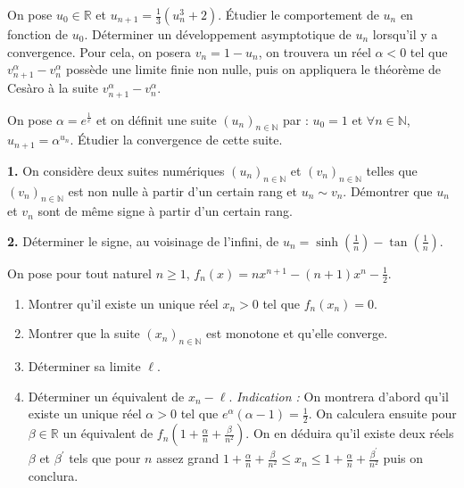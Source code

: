 \begin{exercice}
On pose $u_{0}\in\mathbb{R}$ et $u_{n+1}=\frac{1}{3}(u_{n}^{3}+2)$.
Étudier le comportement de $u_{n}$ en fonction de $u_{0}$.
Déterminer un développement asymptotique de $u_{n}$ lorsqu'il y a convergence.
Pour cela, on posera $v_{n}=1-u_{n}$, on trouvera un réel $\alpha<0$ tel que $v_{n+1}^{\alpha}-v_{n}^{\alpha}$ possède une limite finie non nulle, puis on appliquera le théorème de Cesàro à la suite $v_{n+1}^{\alpha}-v_{n}^{\alpha}$.
\end{exercice}

\begin{exercice}
On pose $\alpha=e^{\frac{1}{e}}$ et on définit une suite $(u_{n})_{n\in\mathbb{N}}$ par :
$u_{0}=1$ et $\forall n\in\mathbb{N}$, $u_{n+1}=\alpha^{u_{n}}$.
Étudier la convergence de cette suite.
\end{exercice}

\begin{exercice}
\textbf{1.} On considère deux suites numériques $(u_{n})_{n\in\mathbb{N}}$ et $(v_{n})_{n\in\mathbb{N}}$ telles que $(v_{n})_{n\in\mathbb{N}}$ est non nulle à partir d'un certain rang et $u_{n}\sim v_{n}$.
Démontrer que $u_{n}$ et $v_{n}$ sont de même signe à partir d'un certain rang.

\textbf{2.} Déterminer le signe, au voisinage de l'infini, de $u_{n}=\sinh(\frac{1}{n})-\tan(\frac{1}{n})$.
\end{exercice}

\begin{exercice}
On pose pour tout naturel $n\ge1$, $f_{n}(x)=nx^{n+1}-(n+1)x^{n}-\frac{1}{2}$.
\begin{enumerate}
    \item Montrer qu'il existe un unique réel $x_{n}>0$ tel que $f_{n}(x_{n})=0$.
    \item Montrer que la suite $(x_{n})_{n\in\mathbb{N}}$ est monotone et qu'elle converge.
    \item Déterminer sa limite $\ell$.
    \item Déterminer un équivalent de $x_{n}-\ell$.
    \textit{Indication :} On montrera d'abord qu'il existe un unique réel $\alpha>0$ tel que $e^{\alpha}(\alpha-1)=\frac{1}{2}$. On calculera ensuite pour $\beta\in\mathbb{R}$ un équivalent de $f_{n}(1+\frac{\alpha}{n}+\frac{\beta}{n^{2}})$. On en déduira qu'il existe deux réels $\beta$ et $\beta^{\prime}$ tels que pour $n$ assez grand $1+\frac{\alpha}{n}+\frac{\beta}{n^{2}}\le x_{n}\le1+\frac{\alpha}{n}+\frac{\beta^{\prime}}{n^{2}}$ puis on conclura.
\end{enumerate}
\end{exercice}

